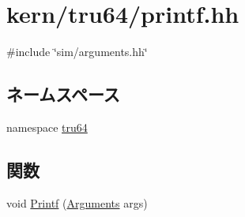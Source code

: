 \hypertarget{printf_8hh}{
\section{kern/tru64/printf.hh}
\label{printf_8hh}
}
{\ttfamily \#include \char`\"{}sim/arguments.hh\char`\"{}}\par
\subsection*{ネームスペース}
\begin{DoxyCompactItemize}
\item 
namespace \hyperlink{namespacetru64}{tru64}
\end{DoxyCompactItemize}
\subsection*{関数}
\begin{DoxyCompactItemize}
\item 
void \hyperlink{namespacetru64_af8b8f48becb5e47991a7e1793e7f08da}{Printf} (\hyperlink{classArguments}{Arguments} args)
\end{DoxyCompactItemize}
